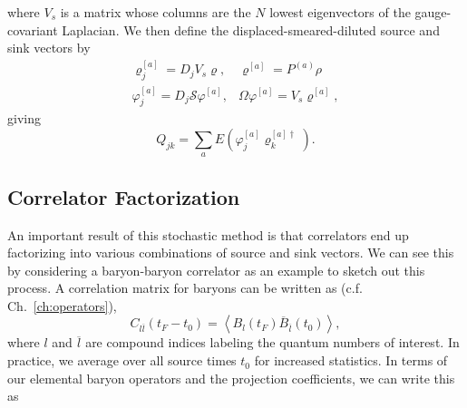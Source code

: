 where $V_s$ is a matrix whose columns are the $N$ lowest eigenvectors of the gauge-covariant Laplacian. We then define the displaced-smeared-diluted source and sink vectors by
\begin{equation}
    \begin{array}{ll}
        \varrho_{j}^{[a]}=D_{j} V_{s} \varrho, & \varrho^{[a]}=P^{(a)} \rho \\
        \varphi_{j}^{[a]}=D_{j} \mathcal{S} \varphi^{[a]}, & \Omega \varphi^{[a]}=V_{s} \varrho^{[a]},
        \end{array}
\end{equation}
giving
\begin{equation}\label{eq:Qjk}
    Q_{j k}=\sum_{a} E\left(\varphi_{j}^{[a]} \varrho_{k}^{[a] \dagger}\right).
\end{equation}
\subsection{Correlator Factorization}
An important result of this stochastic method is that correlators end up factorizing into various combinations of source and sink vectors. We can see this by considering a baryon-baryon correlator as an example to sketch out this process. A correlation matrix for baryons can be written as (c.f. Ch.~\ref{ch:operators}),
\begin{equation}
    C_{l \overline{l}}\left(t_{F}-t_{0}\right)=\left\langle B_{l}\left(t_{F}\right) \overline{B}_{\overline{l}}\left(t_{0}\right)\right\rangle,
\end{equation}
where $l$ and $\overline l$ are compound indices labeling the quantum numbers of interest. In practice, we average over all source times $t_0$ for increased statistics. In terms of our elemental baryon operators and the projection coefficients, we can write this as
